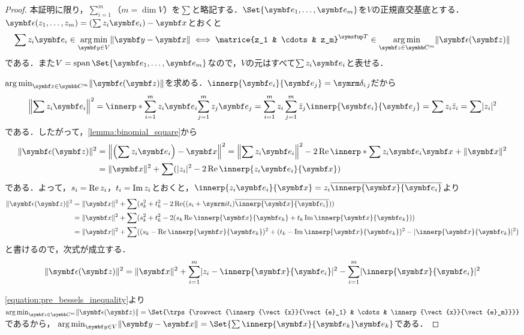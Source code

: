 \documentclass[../../main]{subfiles}
\begin{document}
\begin{proof}
  本証明に限り，\(\sum_{i=1}^m\)（\(m=\dim V\)）を\(\sum\)と略記する．\(\Set{\vect{e}_1,\dots,\vect{e}_m}\)を\(V\)の正規直交基底とする．
  \(\vect{\epsilon}(z_1,\dots,z_m)=(\sum z_i\vect{e}_i)-\vect{x}\)とおくと
  \[
    \sum z_i\vect{e}_i \in \argmin_{\vect{y}\in V}\vnorm{\vect{y}-\vect{x}}
    \iff \trps{\matrice{z_1 & \cdots & z_m}} \in \argmin_{\vect{z}\in\numset{C}^m}\vnorm{\vect{\epsilon}(\vect{z})}
  \]
  である．また\(V=\spannedby\Set{\vect{e}_1,\dots,\vect{e}_m}\)なので，\(V\)の元はすべて\(\sum z_i\vect{e}_i\)と表せる．

  \(\argmin_{\vect{z}\in\numset{C}^m}\vnorm{\vect{\epsilon}(\vect{z})}\)を求める．\(\innerp{\vect{e}_i}{\vect{e}_j}=\kdelta{i}{j}\)だから
  \[
    \vnorm*{\sum z_i\vect{e}_i}^2 = \innerp*{\sum_{i=1}^mz_i\vect{e}_i}{\sum_{j=1}^mz_j\vect{e}_j}
    = \sum_{i=1}^mz_i\sum_{j=1}^m\conj{z}_j\innerp{\vect{e}_i}{\vect{e}_j}
    = \sum z_i\conj{z}_i
    = \sum\abs{z_i}^2
  \]
  である．したがって，\cref{lemma:binomial_square}から
  \begin{align*}
    \vnorm{\vect{\epsilon}(\vect{z})}^2 &= \vnorm*{\pqty*{\sum z_i\vect{e}_i}-\vect{x}}^2
    = \vnorm*{\sum z_i\vect{e}_i}^2-2\rpart\innerp*{\sum z_i\vect{e}_i}{\vect{x}}+\vnorm{\vect{x}}^2 \\
    &= \vnorm{\vect{x}}^2+\sum(\abs{z_i}^2-2\rpart\innerp{z_i\vect{e}_i}{\vect{x}})
  \end{align*}
  である．よって，\(s_i=\operatorname{Re} z_i\)，\(t_i=\operatorname{Im} z_i\)とおくと，\(\innerp{z_i\vect{e}_i}{\vect{x}}=z_i\conj*{\innerp{\vect{x}}{\vect{e}_i}}\)より
  \begin{align*}
    \vnorm{\vect{\epsilon}(\vect{z})}^2 &= \vnorm{\vect{x}}^2+\sum(s_k^2+t_k^2-2\rpart((s_i+\iuni t_i)\conj*{\innerp{\vect{x}}{\vect{e}_i}})) \\
    &= \vnorm{\vect{x}}^2+\sum(s_k^2+t_k^2-2(s_k\rpart\innerp{\vect{x}}{\vect{e}_k}+t_k\ipart\innerp{\vect{x}}{\vect{e}_k})) \\
    &= \vnorm{\vect{x}}^2+\sum((s_k-\rpart\innerp{\vect{x}}{\vect{e}_k})^2+(t_k-\ipart\innerp{\vect{x}}{\vect{e}_k})^2-\abs{\innerp{\vect{x}}{\vect{e}_k}}^2)
  \end{align*}
  と書けるので，次式が成立する．
  \begin{equation}
    \label{equation:pre_bessels_inequality}
    \vnorm{\vect{\epsilon}(\vect{z})}^2 = \vnorm{\vect{x}}^2+\sum_{i=1}^m\abs{z_i-\innerp{\vect{x}}{\vect{e}_i}}^2-\sum_{i=1}^m\abs{\innerp{\vect{x}}{\vect{e}_i}}^2
  \end{equation}

  \cref{equation:pre_bessels_inequality}より\(\argmin_{\vect{z}\in\numset{C}^m}\vnorm{\vect{\epsilon}(\vect{z})}=\Set{\trps{\rowvect{\innerp{\vect{x}}{\vect{e}_1} & \cdots & \innerp{\vect{x}}{\vect{e}_m}}}}\)であるから，
  \(\argmin_{\vect{y}\in V}\vnorm{\vect{y}-\vect{x}}=\Set{\sum\innerp{\vect{x}}{\vect{e}_k}\vect{e}_k}\)である．
\end{proof}
\end{document}
